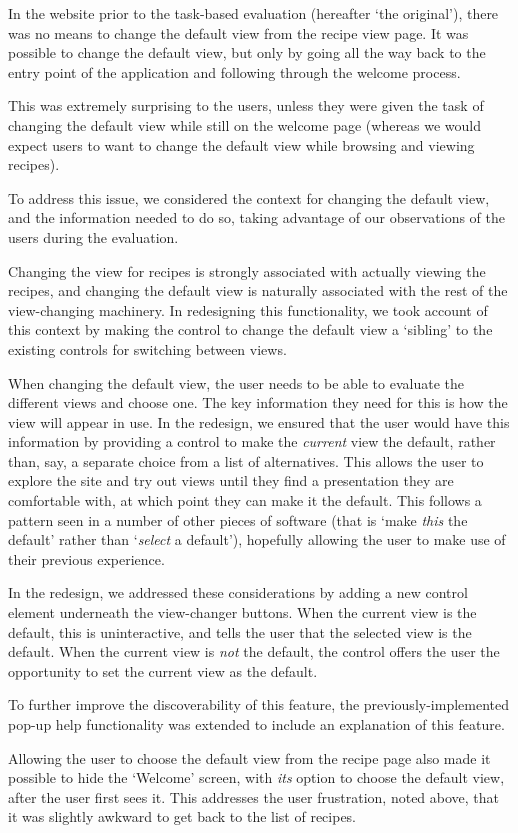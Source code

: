 In the website prior to the task-based evaluation (hereafter `the
original'), there was no means to change the default view from the
recipe view page. It was possible to change the
default view, but only by going all the way back to the entry point of
the application and following through the welcome
process.

This was extremely surprising to the users, unless they were given the
task of changing the default view while still on the welcome page
(whereas we would expect users to want to change the default view
while browsing and viewing recipes).

To address this issue, we considered the context for changing the
default view, and the information needed to do so, taking advantage of
our observations of the users during the evaluation.


Changing the view for recipes is strongly associated with actually
viewing the recipes, and changing the default view is naturally
associated with the rest of the view-changing machinery. In
redesigning this functionality, we took account of this context by
making the control to change the default view a `sibling' to the
existing controls for switching between views.

When changing the default view, the user needs to be able to evaluate
the different views and choose one. The key information they need for
this is how the view will appear in use. In the redesign, we ensured
that the user would have this information by providing a control to
make the \emph{current} view the default, rather than, say, a separate
choice from a list of alternatives. This allows the user to explore
the site and try out views until they find a presentation they are
comfortable with, at which point they can make it the default. This
follows a pattern seen in a number of other pieces of software (that
is `make \emph{this} the default' rather than `\emph{select} a
default'), hopefully allowing the user to make use of their previous
experience.

In the redesign, we addressed these considerations by adding a new
control element underneath the view-changer buttons. When the current
view is the default, this is uninteractive, and tells the user that
the selected view is the default. When the current
view is \emph{not} the default, the control offers the user the
opportunity to set the current view as the default.

To further improve the discoverability of this feature, the
previously-implemented pop-up help functionality was extended to
include an explanation of this feature.

Allowing the user to choose the default view from the recipe page also
made it possible to hide the `Welcome' screen, with \emph{its} option
to choose the default view, after the user first sees it. This
addresses the user frustration, noted above, that it was slightly
awkward to get back to the list of recipes.
